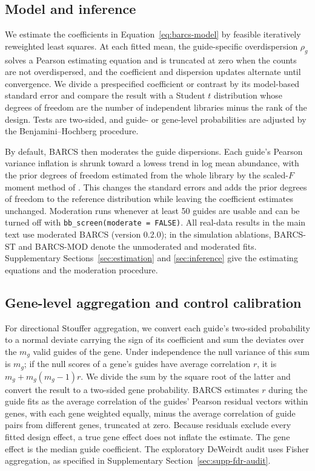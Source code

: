 \subsection{Model and inference}

We estimate the coefficients in Equation~\eqref{eq:barcs-model} by feasible
iteratively reweighted least squares.  At each fitted mean, the guide-specific
overdispersion $\rho_g$ solves a Pearson estimating equation and is truncated
at zero when the counts are not overdispersed, and the coefficient and
dispersion updates alternate until convergence.  We divide a prespecified
coefficient or contrast by its model-based standard error and compare the
result with a Student $t$ distribution whose degrees of freedom are the number
of independent libraries minus the rank of the design.  Tests are two-sided,
and guide- or gene-level probabilities are adjusted by the Benjamini--Hochberg
procedure.

By default, BARCS then moderates the guide dispersions.  Each guide's Pearson
variance inflation is shrunk toward a lowess trend in log mean abundance, with
the prior degrees of freedom estimated from the whole library by the
scaled-$F$ moment method of \citet{smyth2004linear}.  This changes the
standard errors and adds the prior degrees of freedom to the reference
distribution while leaving the coefficient estimates unchanged.  Moderation
runs whenever at least 50 guides are usable and can be turned off with
\texttt{bb\_screen(moderate = FALSE)}.  All real-data results in the main text
use moderated BARCS (version 0.2.0); in the simulation ablations, BARCS-ST and
BARCS-MOD denote the unmoderated and moderated fits.  Supplementary
Sections~\ref{sec:estimation} and \ref{sec:inference} give the estimating
equations and the moderation procedure.

\subsection{Gene-level aggregation and control calibration}

For directional Stouffer aggregation, we convert each guide's two-sided
probability to a normal deviate carrying the sign of its coefficient and sum
the deviates over the $m_g$ valid guides of the gene.  Under independence the
null variance of this sum is $m_g$; if the null scores of a gene's guides have
average correlation $r$, it is $m_g+m_g(m_g-1)r$.  We divide the sum by the
square root of the latter and convert the result to a two-sided gene
probability.  BARCS estimates $r$ during the guide fits as the average
correlation of the guides' Pearson residual vectors within genes, with each
gene weighted equally, minus the average correlation of guide pairs from
different genes, truncated at zero.  Because residuals exclude every fitted
design effect, a true gene effect does not inflate the estimate.  The gene
effect is the median guide coefficient.  The exploratory DeWeirdt audit uses Fisher aggregation, as
specified in Supplementary Section~\ref{sec:supp-fdr-audit}.

